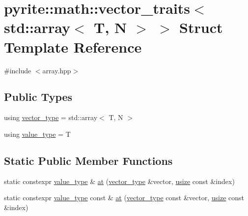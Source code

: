 \hypertarget{structpyrite_1_1math_1_1vector__traits_3_01std_1_1array_3_01_t_00_01_n_01_4_01_4}{}\section{pyrite\+:\+:math\+:\+:vector\+\_\+traits$<$ std\+:\+:array$<$ T, N $>$ $>$ Struct Template Reference}
\label{structpyrite_1_1math_1_1vector__traits_3_01std_1_1array_3_01_t_00_01_n_01_4_01_4}


{\ttfamily \#include $<$array.\+hpp$>$}

\subsection*{Public Types}
\begin{DoxyCompactItemize}
\item 
using \mbox{\hyperlink{structpyrite_1_1math_1_1vector__traits_3_01std_1_1array_3_01_t_00_01_n_01_4_01_4_ab56bcf2e100c6dc74210043b04d2e2e5}{vector\+\_\+type}} = std\+::array$<$ T, N $>$
\item 
using \mbox{\hyperlink{structpyrite_1_1math_1_1vector__traits_3_01std_1_1array_3_01_t_00_01_n_01_4_01_4_ac0670c23e2c162f7e82457937744950b}{value\+\_\+type}} = T
\end{DoxyCompactItemize}
\subsection*{Static Public Member Functions}
\begin{DoxyCompactItemize}
\item 
static constexpr \mbox{\hyperlink{structpyrite_1_1math_1_1vector__traits_3_01std_1_1array_3_01_t_00_01_n_01_4_01_4_ac0670c23e2c162f7e82457937744950b}{value\+\_\+type}} \& \mbox{\hyperlink{structpyrite_1_1math_1_1vector__traits_3_01std_1_1array_3_01_t_00_01_n_01_4_01_4_a1172afb4039475693603d89d211c9c6d}{at}} (\mbox{\hyperlink{structpyrite_1_1math_1_1vector__traits_3_01std_1_1array_3_01_t_00_01_n_01_4_01_4_ab56bcf2e100c6dc74210043b04d2e2e5}{vector\+\_\+type}} \&vector, \mbox{\hyperlink{type_8hpp_a3984e6dc0a53b867e054e8447f2f2be1}{usize}} const \&index)
\item 
static constexpr \mbox{\hyperlink{structpyrite_1_1math_1_1vector__traits_3_01std_1_1array_3_01_t_00_01_n_01_4_01_4_ac0670c23e2c162f7e82457937744950b}{value\+\_\+type}} const  \& \mbox{\hyperlink{structpyrite_1_1math_1_1vector__traits_3_01std_1_1array_3_01_t_00_01_n_01_4_01_4_a42f207b251670881132aeefb8688407a}{at}} (\mbox{\hyperlink{structpyrite_1_1math_1_1vector__traits_3_01std_1_1array_3_01_t_00_01_n_01_4_01_4_ab56bcf2e100c6dc74210043b04d2e2e5}{vector\+\_\+type}} const \&vector, \mbox{\hyperlink{type_8hpp_a3984e6dc0a53b867e054e8447f2f2be1}{usize}} const \&index)
\end{DoxyCompactItemize}
